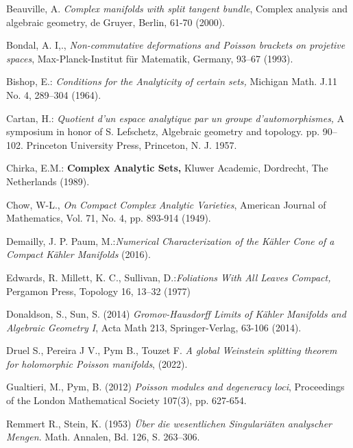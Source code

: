 \documentclass[12pt,twoside,a4paper]{report}
\begin{document}
 Beauville, A. {\it Complex manifolds with split tangent bundle}, Complex analysis and algebraic geometry, de Gruyer, Berlin, 61-70 (2000).

 Bondal, A. I,., {\it Non-commutative deformations and Poisson brackets on projetive spaces},  Max-Planck-Institut f\"ur Matematik, Germany, 93–67 (1993).

 Bishop, E.: {\it Conditions for the Analyticity of certain sets,} Michigan Math. J.11 No. 4,
289--304 (1964).

 Cartan, H.: {\it Quotient d'un espace analytique par un groupe d'automorphismes,} A symposium in honor of S. Lefschetz, Algebraic geometry and topology. pp. 90--102. Princeton University Press, Princeton, N. J. 1957.

 Chirka, E.M.: {\bf Complex Analytic Sets,} Kluwer Academic, Dordrecht, The Netherlands
(1989).

 Chow, W-L., {\it On Compact Complex Analytic Varieties}, American Journal of Mathematics, Vol. 71, No. 4, pp. 893-914 (1949).

 Demailly, J. P. Paum, M.:{\it Numerical Characterization of the Kähler Cone of a Compact Kähler Manifolds} (2016).

 Edwards, R.  Millett, K. C., Sullivan, D.:{\it Foliations With All Leaves Compact,} Pergamon Press,
Topology 16, 13--32 (1977)










 Donaldson, S., Sun, S. (2014) {\it Gromov-Hausdorff Limits of K\"ahler Manifolds and Algebraic Geometry I}, Acta Math 213, Springer-Verlag, 63-106 (2014).

Druel S., Pereira J V., Pym B., Touzet F. {\it A global Weinstein splitting theorem for 
holomorphic Poisson manifolds}, (2022).


 Gualtieri, M., Pym, B. (2012) \textit{Poisson modules and degeneracy loci},
Proceedings of the London Mathematical Society 107(3), pp. 627-654.

 Remmert R., Stein, K. (1953) \textit{Über die wesentlichen
Singulariäten analyscher Mengen}. Math. Annalen, Bd. 126, S. 263--306.
\end{document}
